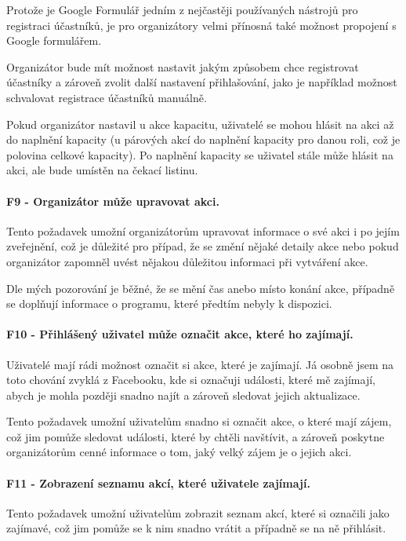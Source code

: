 Protože je Google Formulář jedním z nejčastěji používaných nástrojů pro registraci účastníků, je pro organizátory velmi přínosná také možnost propojení s Google formulářem.

Organizátor bude mít možnost nastavit jakým způsobem chce registrovat účastníky a zároveň zvolit další nastavení přihlašování, jako je například možnost schvalovat registrace účastníků manuálně.

Pokud organizátor nastavil u akce kapacitu, uživatelé se mohou hlásit na akci až do naplnění kapacity (u párových akcí do naplnění kapacity pro danou roli, což je polovina celkové kapacity). Po naplnění kapacity se uživatel stále může hlásit na akci, ale bude umístěn na čekací listinu. 

\paragraph{F9 - Organizátor může upravovat akci.}\label{req:F9}
Tento požadavek umožní organizátorům upravovat informace o své akci i po jejím zveřejnění, což je důležité pro případ, že se změní nějaké detaily akce nebo pokud organizátor zapomněl uvést nějakou důležitou informaci při vytváření akce.

Dle mých pozorování je běžné, že se mění čas anebo místo konání akce, případně se doplňují informace o programu, které předtím nebyly k dispozici.

\paragraph{F10 - Přihlášený uživatel může označit akce, které ho zajímají.}\label{req:F10}
Uživatelé mají rádi možnost označit si akce, které je zajímají. Já osobně jsem na toto chování zvyklá z Facebooku, kde si označuji události, které mě zajímají, abych je mohla později snadno najít a zároveň sledovat jejich aktualizace.

Tento požadavek umožní uživatelům snadno si označit akce, o které mají zájem, což jim pomůže sledovat události, které by chtěli navštívit, a zároveň poskytne organizátorům cenné informace o tom, jaký velký zájem je o jejich akci.

\paragraph{F11 - Zobrazení seznamu akcí, které uživatele zajímají.}\label{req:F11}
Tento požadavek umožní uživatelům zobrazit seznam akcí, které si označili jako zajímavé, což jim pomůže se k nim snadno vrátit a případně se na ně přihlásit.

